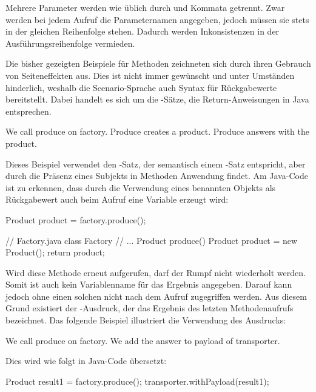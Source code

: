 Mehrere Parameter werden wie üblich durch  und Kommata getrennt.
Zwar werden bei jedem Aufruf die Parameternamen angegeben, jedoch müssen sie stets in der gleichen Reihenfolge stehen.
Dadurch werden Inkonsistenzen in der Ausführungsreihenfolge vermieden.

Die bisher gezeigten Beispiele für Methoden zeichneten sich durch ihren Gebrauch von Seiteneffekten aus.
Dies ist nicht immer gewünscht und unter Umständen hinderlich, weshalb die Scenario-Sprache auch Syntax für Rückgabewerte bereitstellt.
Dabei handelt es sich um die -Sätze, die Return-Anweisungen in Java entsprechen.

\begin{codeblock}
    We call produce on factory.
    Produce creates a product.
    Produce answers with the product.
\end{codeblock}

Dieses Beispiel verwendet den -Satz, der semantisch einem -Satz entspricht, aber durch die Präsenz eines Subjekts in Methoden Anwendung findet.
Am Java-Code ist zu erkennen, dass durch die Verwendung eines benannten Objekts als Rückgabewert auch beim Aufruf eine Variable erzeugt wird:

\begin{jcodeblock}
    Product product = factory.produce();

    // Factory.java
    class Factory {
        // ...
        Product produce() {
            Product product = new Product();
            return product;
        }
    }
\end{jcodeblock}

Wird diese Methode erneut aufgerufen, darf der Rumpf nicht wiederholt werden.
Somit ist auch kein Variablenname für das Ergebnis angegeben.
Darauf kann jedoch ohne einen solchen nicht nach dem Aufruf zugegriffen werden.
Aus diesem Grund existiert der -Ausdruck, der das Ergebnis des letzten Methodenaufrufs bezeichnet.
Das folgende Beispiel illustriert die Verwendung des Ausdrucks:

\begin{codeblock}
    We call produce on factory.
    We add the answer to payload of transporter.
\end{codeblock}

Dies wird wie folgt in Java-Code übersetzt:

\begin{jcodeblock}
    Product result1 = factory.produce();
    transporter.withPayload(result1);
\end{jcodeblock}

